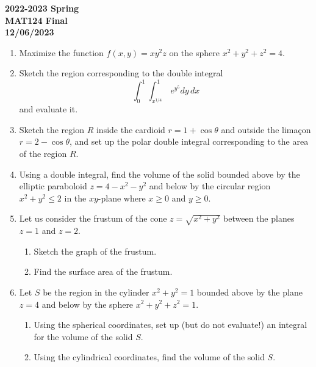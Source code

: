 \documentclass[a4paper, 12pt]{article}
\renewcommand{\headrulewidth}{0pt}
\begin{document}
\pagestyle{empty}

\begin{center}
\textbf{2022-2023 Spring\\MAT124 Final\\12/06/2023}
\end{center}

\begin{enumerate}[leftmargin=*,label=\textbf{\arabic*.}]
\item Maximize the function $f(x,y)=xy^2z$ on the sphere $x^2+y^2+z^2 = 4$.

\item Sketch the region corresponding to the double integral
\[\int_0^1\int_{x^{1/4}}^1\,{e}^{y^5}dy\,dx\]
and evaluate it.

\item Sketch the region $R$ inside the cardioid $r=1+\cos\theta$ and outside the limaçon $r=2-\cos\theta$, and set up the polar double integral corresponding to the area of the region $R$.

\item Using a double integral, find the volume of the solid bounded above by the elliptic paraboloid $z=4-x^2-y^2$ and below by the circular region $x^2+y^2\leq2$ in the $xy$-plane where $x\geq0$ and $y\geq0$.

\item Let us consider the frustum of the cone $z=\sqrt{x^2+y^2}$ between the planes $z=1$ and $z=2$.

\begin{enumerate}[leftmargin=*,label=\textbf{\alph*.}]
\item Sketch the graph of the frustum.
\item Find the surface area of the frustum.
\end{enumerate}

\item Let $S$ be the region in the cylinder $x^2+y^2 = 1$ bounded above by the plane $z=4$ and below by the sphere $x^2+y^2+z^2=1$.
\begin{enumerate}[leftmargin=*,label=\textbf{\alph*.}]
\item Using the spherical coordinates, set up (but do not evaluate!) an integral for the volume of the solid $S$.
\item Using the cylindrical coordinates, find the volume of the solid $S$.
\end{enumerate}
\end{enumerate}

\newpage
\pagestyle{fancy}
\renewcommand{\headrulewidth}{1pt}
\end{document}
